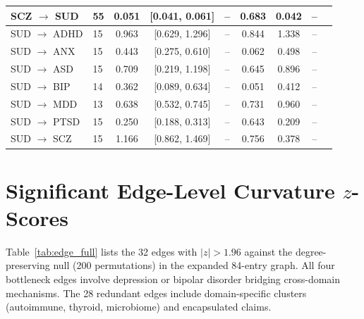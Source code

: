 \documentclass[11pt]{article}
\begin{document}
\begin{table}[h]
\begin{tabular}{llccccccc}
SCZ $\to$ SUD & 55 & 0.051 & [0.041, 0.061] & -- & 0.683 & 0.042 & -- \\
\midrule
SUD $\to$ ADHD & 15 & 0.963 & [0.629, 1.296] & -- & 0.844 & 1.338 & -- \\
SUD $\to$ ANX & 15 & 0.443 & [0.275, 0.610] & -- & 0.062 & 0.498 & -- \\
SUD $\to$ ASD & 15 & 0.709 & [0.219, 1.198] & -- & 0.645 & 0.896 & -- \\
SUD $\to$ BIP & 14 & 0.362 & [0.089, 0.634] & -- & 0.051 & 0.412 & -- \\
SUD $\to$ MDD & 13 & 0.638 & [0.532, 0.745] & -- & 0.731 & 0.960 & -- \\
SUD $\to$ PTSD & 15 & 0.250 & [0.188, 0.313] & -- & 0.643 & 0.209 & -- \\
SUD $\to$ SCZ & 15 & 1.166 & [0.862, 1.469] & -- & 0.756 & 0.378 & -- \\
\bottomrule
\end{tabular}
\end{table}

\section{Significant Edge-Level Curvature $z$-Scores}
\label{app:edges}

Table~\ref{tab:edge_full} lists the 32 edges with $|z| > 1.96$ against the degree-preserving null (200 permutations) in the expanded 84-entry graph. All four bottleneck edges involve depression or bipolar disorder bridging cross-domain mechanisms. The 28 redundant edges include domain-specific clusters (autoimmune, thyroid, microbiome) and encapsulated claims.
\end{document}
